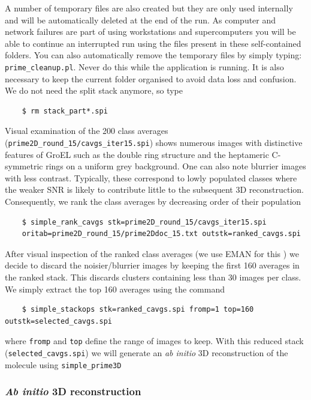 \documentclass[a4paper,11pt]{article}
\newcommand{\prgname}[1]{\textcolor{NavyBlue}{\texttt{#1}}}
\begin{document}
A number of temporary files are also created but they are only used internally and will be automatically deleted at the end of the run. As computer and network failures are part of using workstations and supercomputers you will be able to continue an interrupted run using the files present in these self-contained folders. You can also automatically remove the temporary files by simply typing: \prgname{prime\_cleanup.pl}. Never do this while the application is running.  It is also necessary to keep the current folder organised to avoid data loss and confusion. We do not need the split stack anymore, so type
\begin{verbatim}
    $ rm stack_part*.spi
\end{verbatim}
Visual examination of the 200 class averages (\texttt{prime2D\_round\_15/cavgs\_iter15.spi}) shows numerous images with distinctive features of GroEL such as the double ring structure and the heptameric C-symmetric rings on a uniform grey background. One can also note blurrier images with less contrast. Typically, these correspond to lowly populated classes where the weaker SNR is likely to contribute little to the subsequent 3D reconstruction. Consequently, we rank the class averages by decreasing order of their population
\begin{verbatim}
    $ simple_rank_cavgs stk=prime2D_round_15/cavgs_iter15.spi 
    oritab=prime2D_round_15/prime2Ddoc_15.txt outstk=ranked_cavgs.spi
\end{verbatim}
After visual inspection of the ranked class averages (we use EMAN for this \citep{Ludtke:1999aa,Tang:2007aa}) we decide to discard the noisier/blurrier images by keeping the first 160 averages in the ranked stack. This discards clusters containing less than 30 images per class. We simply extract the top 160 averages using the command
\begin{verbatim}
    $ simple_stackops stk=ranked_cavgs.spi fromp=1 top=160 outstk=selected_cavgs.spi
\end{verbatim}
where \texttt{fromp} and \texttt{top} define the range of images to keep. With this reduced stack (\texttt{selected\_cavgs.spi}) we will generate an \textit{ab initio} 3D reconstruction of the molecule using \prgname{simple\_prime3D}

\subsubsection{\textit{Ab initio} 3D reconstruction}
\end{document}
